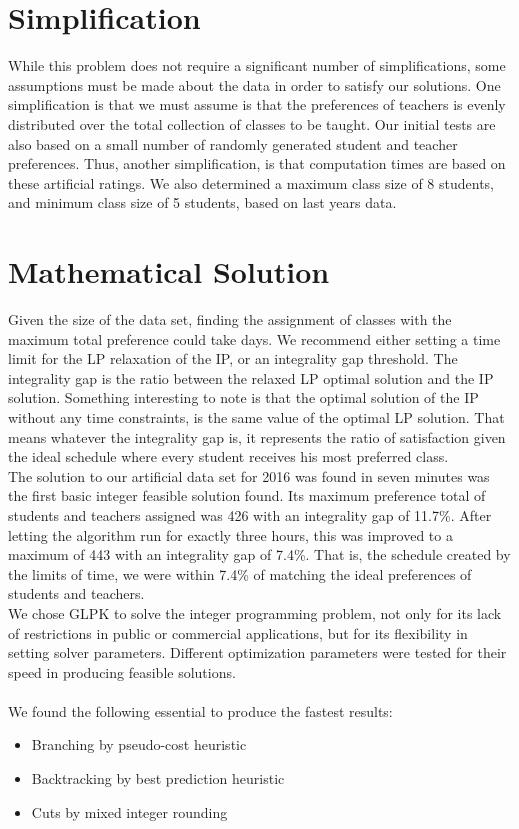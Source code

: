 \documentclass[11pt]{article}
\begin{document}
\section{Simplification}
While this problem does not require a significant number of simplifications, some assumptions must be made about the data in order to satisfy our solutions. One simplification is that we must assume is that the preferences of teachers is evenly distributed over the total collection of classes to be taught. Our initial tests are also based on a small number of randomly generated student and teacher preferences. Thus, another simplification, is that computation times are based on these artificial ratings. We also determined a maximum class size of 8 students, and minimum class size of 5 students, based on last years data.\\


\section{Mathematical Solution}
\indent Given the size of the data set, finding the assignment of classes with the maximum total preference could take days. We recommend either setting a time limit for the LP relaxation of the IP, or an integrality gap threshold. The integrality gap is the ratio between the relaxed LP optimal solution and the IP solution. Something interesting to note is that the optimal solution of the IP without any time constraints, is the same value of the optimal LP solution. That means whatever the integrality gap is, it represents the ratio of satisfaction given the ideal schedule where every student receives his most preferred class.\\
\indent The solution to our artificial data set for 2016 was found in seven minutes was the first basic integer feasible solution found. Its maximum preference total of students and teachers assigned was 426 with an integrality gap of 11.7\%.  After letting the algorithm run for exactly three hours, this was improved to a maximum of 443 with an integrality gap of 7.4\%. That is, the schedule created by the limits of time, we were within 7.4\% of matching the ideal preferences of students and teachers.\\
\indent We chose GLPK to solve the integer programming problem, not only for its lack of restrictions in public or commercial applications, but for its flexibility in setting solver parameters. Different optimization parameters were tested for their speed in producing feasible solutions.\\\\
We found the following essential to produce the fastest results:
\begin{itemize}
	\item Branching by pseudo-cost heuristic
	\item Backtracking by best prediction heuristic
	\item Cuts by mixed integer rounding
\end{itemize}
\end{document}
